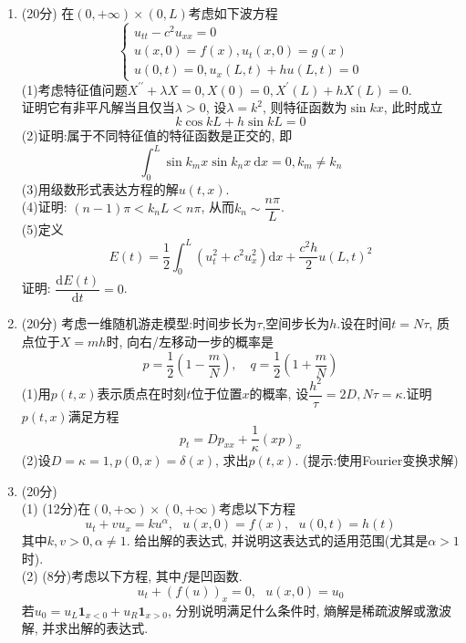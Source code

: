 \begin{enumerate}
\item (20分) 在$(0,+\infty)\times(0,L)$考虑如下波方程
\begin{equation*}
    \begin{cases}
     u_{tt}-c^{2}u_{xx}=0\\
     u(x,0)=f(x),u_t(x,0)=g(x) \\
     u(0,t)=0,u_x(L,t)+hu(L,t)=0
    \end{cases}
\end{equation*}
(1)考虑特征值问题$X^{\prime \prime}+\lambda X=0,X(0)=0,X^{\prime}(L)+hX(L)=0$.\\
证明它有非平凡解当且仅当$\lambda>0$, 设$\lambda=k^{2}$, 则特征函数为$\sin kx$, 此时成立
\begin{equation*}
    k\cos kL+h \sin kL=0
\end{equation*}
(2)证明:属于不同特征值的特征函数是正交的, 即
\begin{equation*}
    \int_{0}^{L} \sin k_m x \sin k_n x \ \mathrm{d}x=0,k_m \neq k_n
\end{equation*}
(3)用级数形式表达方程的解$u(t,x)$.\\
(4)证明: $ (n-1)\pi < k_n L <n \pi$, 从而$k_n \sim \dfrac{n \pi}{L}$.\\
(5)定义
\begin{equation*}
    E(t)=\frac{1}{2}\int_{0}^{L} \left(u_t^{2}+c^2u_x^{2}\right)\mathrm{d}x+\frac{c^{2}h}{2}u(L,t)^{2}
\end{equation*}
证明: $\dfrac{\mathrm{d}E(t)}{\mathrm{d}t}=0$.

\item (20分) 考虑一维随机游走模型:时间步长为$\tau$,空间步长为$h$.设在时间$t=N\tau$, 质点位于$X=mh$时, 向右/左移动一步的概率是
\begin{equation*}
    p=\frac{1}{2}\left(1-\dfrac{m}{N}\right), \quad q=\frac{1}{2}\left(1+\dfrac{m}{N}\right)
\end{equation*}
(1)用$p(t,x)$表示质点在时刻$t$位于位置$x$的概率, 设$\dfrac{h^{2}}{\tau}=2D,N\tau=\kappa$.证明$p(t,x)$满足方程
\begin{equation*}
    p_t=Dp_{xx}+\frac{1}{\kappa}(xp)_x
\end{equation*}
(2)设$D=\kappa=1,p(0,x)=\delta(x)$, 求出$p(t,x)$. (提示:使用Fourier变换求解)

\item (20分) \\
(1) (12分)在$(0,+\infty) \times (0,+\infty)$考虑以下方程
\begin{equation*}
    u_t+vu_x=ku^{\alpha},\ \ \ u(x,0)=f(x),\ \ \ u(0,t)=h(t)
\end{equation*}
其中$k,v>0,\alpha \neq 1$. 给出解的表达式, 并说明这表达式的适用范围(尤其是$\alpha>1$时).\\
(2) (8分)考虑以下方程, 其中$f$是凹函数.
\begin{equation*}
    u_t+(f(u))_x=0,\ \ \ u(x,0)=u_0
\end{equation*}
若$u_0=u_L\textbf{1}_{x<0}+u_R\textbf{1}_{x>0}$, 分别说明满足什么条件时, 熵解是稀疏波解或激波解, 并求出解的表达式.
\end{enumerate}

